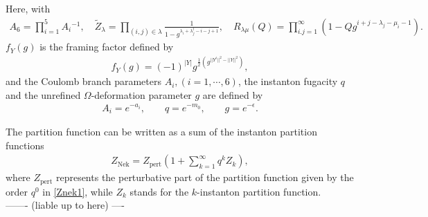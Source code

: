 \documentclass[11pt,a4paper]{article}
\begin{document}
Here, 
with 
\begin{align}
A_6 
= \prod_{i=1}^5 A_i{}^{-1}, 
\quad
\tilde{Z}_{\lambda} 
= \prod_{(i,j) \in \lambda} \frac{1}{1 - g^{\lambda_i + \lambda^t_j - i - j +1} } , 
\quad
R_{\lambda \mu } (Q)= \prod_{i.j=1}^{\infty} (1 - Q g^{i+j-\lambda_j - \mu_i -1}).
\end{align}
$f_{Y}(g)$ is the framing factor defined by
\begin{align}
f_Y(g) = (-1)^{|Y|}g^{\frac{1}{2}(g^{||Y^t||^2 - ||Y||^2})},
\end{align}
and the Coulomb branch parameters $A_i, (i=1, \cdots, 6)$, the instanton fugacity $q$ and the unrefined $\Omega$-deformation parameter $g$ are defined by 
\begin{align}
A_i = e^{-a_i}, \qquad q = e^{-m_0}, \qquad g=e^{-\epsilon}.
\end{align}

The partition function can be written as a sum of the instanton partition functions 
\begin{align}
Z_{\text{Nek}} = Z_{\text{pert}}\left(1 + \sum_{k=1}^{\infty}q^kZ_k\right) ,
\end{align}
where $Z_{\text{pert}}$ represents the perturbative part of the partition function given by the order $q^0$ in \eqref{Znek1}, while $Z_k$ stands for the $k$-instanton partition function. \\
------- (liable up to here) ----\\
\end{document}
